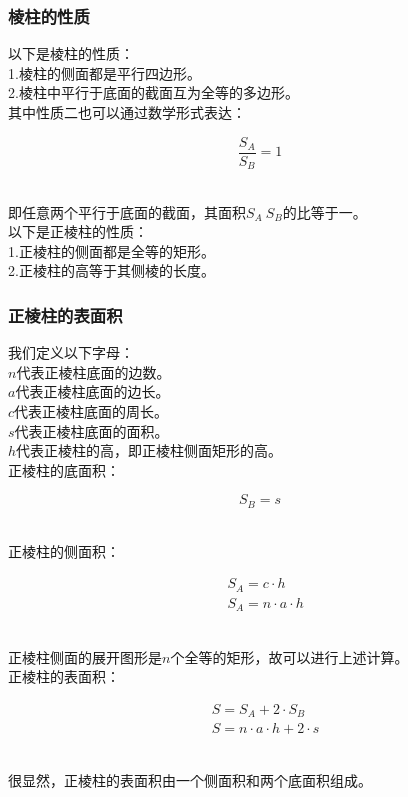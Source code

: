 \documentclass[UTF8]{ctexart}
\begin{document}
\subsubsection{棱柱的性质}
    以下是棱柱的性质：\\[3mm]
    1.棱柱的侧面都是平行四边形。\\[3mm]
    2.棱柱中平行于底面的截面互为全等的多边形。\\[3mm]
    其中性质二也可以通过数学形式表达：
    \begin{large}
        \begin{equation*}
            \frac{S_A}{S_B}=1
        \end{equation*}
    \end{large}\\
    即任意两个平行于底面的截面，其面积$S_A~S_B$的比等于一。\\[8mm]
    以下是正棱柱的性质：\\[3mm]
    1.正棱柱的侧面都是全等的矩形。\\[3mm]
    2.正棱柱的高等于其侧棱的长度。

\newpage

\subsubsection{正棱柱的表面积}
    我们定义以下字母：\\[3mm]
    $n$代表正棱柱底面的边数。\\[3mm]
    $a$代表正棱柱底面的边长。\\[3mm]
    $c$代表正棱柱底面的周长。\\[3mm]
    $s$代表正棱柱底面的面积。\\[3mm]
    $h$代表正棱柱的高，即正棱柱侧面矩形的高。\\[6mm]
    正棱柱的底面积：
    \begin{large}
        \begin{equation*}
            S_B=s
        \end{equation*}
    \end{large}\\
    正棱柱的侧面积：
    \begin{large}
        \begin{align*}
            &S_A=c\cdot h\\[3mm]
            &S_A=n\cdot a\cdot h
        \end{align*}
    \end{large}\\
    正棱柱侧面的展开图形是$n$个全等的矩形，故可以进行上述计算。\\[8mm]
    正棱柱的表面积：
    \begin{large}
        \begin{align*}
            &S=S_A+2\cdot S_B\\[3mm]
            &S=n\cdot a\cdot h+2\cdot s
        \end{align*}
    \end{large}\\
    很显然，正棱柱的表面积由一个侧面积和两个底面积组成。
    
\end{document}
